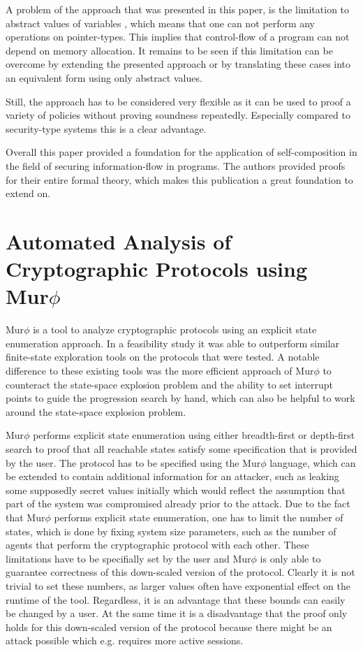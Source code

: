 \documentclass[a4paper,UKenglish]{lipics-v2018}
\def\murphi{Mur$\phi$ }
\begin{document}
A problem of the approach that was presented in this paper, is the limitation to abstract values of variables
\cite{information_flow_by_self_composition}, which means that one can not perform any operations on pointer-types. This implies that control-flow of a program can not depend on memory allocation. It remains to be seen if this limitation can be overcome by extending the presented approach or by translating these cases into an equivalent form using only abstract values.

Still, the approach has to be considered very flexible as it can be used to proof a variety of policies without proving soundness repeatedly. Especially compared to security-type systems this is a clear advantage.

Overall this paper provided a foundation for the application of self-composition in the field of securing information-flow in programs. The authors provided proofs for their entire formal theory, which makes this publication a great foundation to extend on.




\section{Automated Analysis of Cryptographic Protocols using \murphi}

\murphi is a tool to analyze cryptographic protocols using an explicit state enumeration approach. In a feasibility study it was able to outperform similar finite-state exploration tools on the protocols that were tested. A notable difference to these existing tools was the more efficient approach of \murphi to counteract the state-space explosion problem and the ability to set interrupt points to guide the progression search by hand, which can also be helpful to work around the state-space explosion problem.\cite{murphi}

\murphi performs explicit state enumeration using either breadth-first or depth-first search to proof that all reachable states satisfy some specification that is provided by the user. The protocol has to be specified using the \murphi language, which can be extended to contain additional information for an attacker, such as leaking some supposedly secret values initially which would reflect the assumption that part of the system was compromised already prior to the attack. Due to the fact that \murphi performs explicit state enumeration, one has to limit the number of states, which is done by fixing system size parameters, such as the number of agents that perform the cryptographic protocol with each other. These limitations have to be specifially set by the user and \murphi is only able to guarantee correctness of this down-scaled version of the protocol. Clearly it is not trivial to set these numbers, as larger values often have exponential effect on the runtime of the tool.\cite{murphi} Regardless, it is an advantage that these bounds can easily be changed by a user. At the same time it is a disadvantage that the proof only holds for this down-scaled version of the protocol because there might be an attack possible which e.g. requires more active sessions.
\end{document}
